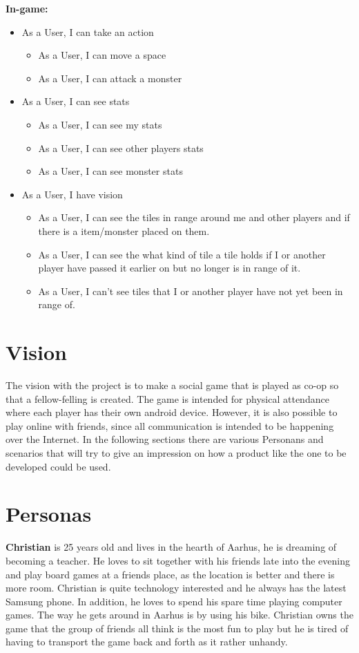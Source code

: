 	\textbf{In-game:}
	\begin{itemize}	
		
		\item As a User, I can take an action
		\begin{itemize}
			\item As a User, I can move a space
			\item As a User, I can attack a monster
		\end{itemize}
		
		\item As a User, I can see stats
		\begin{itemize}
			\item As a User, I can see my stats
			\item As a User, I can see other players stats
			\item As a User, I can see monster stats
		\end{itemize}
		\item As a User, I have vision
		\begin{itemize}
			\item As a User, I can see the tiles in range around me and other players and if there is a item/monster placed on them.
			\item As a User, I can see the what kind of tile a tile holds if I or another player have passed it earlier on but no longer is in range of it.
			\item As a User, I can't see tiles that I or another player have not yet been in range of.
		\end{itemize}
	\end{itemize}


\section{Vision}
	The vision with the project is to make a social game that is played as co-op so that a fellow-felling is created.  The game is intended for physical attendance where each player has their own android device. However, it is also possible to play online with friends, since all communication is intended to be happening over the Internet. In the following sections there are various Personans and scenarios that will try to give an impression on how a product like the one to be developed could be used.


\section{Personas}
\textbf{Christian} is 25 years old and lives in the hearth of Aarhus, he is dreaming of becoming a teacher. He loves to sit together with his friends late into the evening and play board games at a friends place, as the location is better and there is more room. Christian is quite technology interested and he always has the latest Samsung phone. In addition, he loves to spend his spare time playing computer games. The way he gets around in Aarhus is by using his bike. Christian owns the game that the group of friends all think is the most fun to play but he is tired of having to transport the game back and forth as it rather unhandy.

